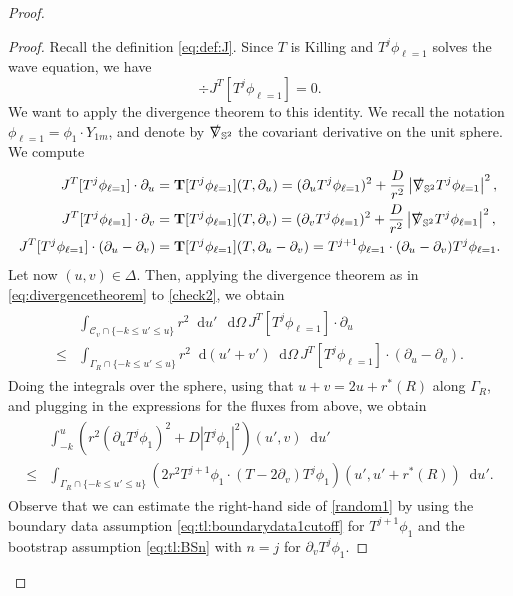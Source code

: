 \documentclass[11pt,english]{article}
\numberwithin{equation}{section}
\theoremstyle{remark}
\theoremstyle{plain}
\theoremstyle{remark}
\newcommand{\dd}{\mathop{}\!\mathrm{d}}
\newcommand{\pu}{\partial_u}
\newcommand{\pv}{\partial_v}
\renewcommand{\(}{\left(}
\renewcommand{\)}{\right)}
\begin{document}
\begin{proof}
\begin{proof}
Recall the definition \eqref{eq:def:J}. Since $T$ is Killing and $T^j\phi_{\ell=1}$ solves the wave equation, we have
\begin{equation}\label{check2}
\div J^T[T^j\phi_{\ell=1}]=0.
\end{equation}
We want to apply the divergence theorem to this identity. We recall the notation $\phi_{\ell=1}=\phi_1\cdot Y_{1m}$, and denote by $\slashed{\nabla}_{\mathbb{S}^2}$ the covariant derivative on the unit sphere. We compute
\begin{align*}
J^T[T^j\phi_{\ell=1}]\cdot \pu&=\mathbf{T}[T^j\phi_{\ell=1}](T,\pu)			=	(\pu T^j\phi_{\ell=1})^2+\frac{D}{r^2}\left|\slashed{\nabla}_{\mathbb{S}^2} T^j\phi_{\ell=1}\right|^2,		\\
J^T[T^j\phi_{\ell=1}]\cdot \pv&=\mathbf{T}[T^j\phi_{\ell=1}](T,\pv)			=		(\pv T^j\phi_{\ell=1})^2+\frac{D}{r^2}\left|\slashed{\nabla}_{\mathbb{S}^2} T^j \phi_{\ell=1}\right|^2	,	\\
J^T[T^j\phi_{\ell=1}]\cdot (\pu-\pv)&=\mathbf{T}[T^j\phi_{\ell=1}](T,\pu-\pv)	=	T^{j+1}\phi_{\ell=1}\cdot (\pu-\pv)T^j \phi_{\ell=1}	.
\end{align*}
Let now $(u,v)\in\Delta$. Then, applying the divergence theorem as in \eqref{eq:divergencetheorem} to \eqref{check2}, we obtain
\begin{align}
\begin{split}
&\int_{\mathcal{C}_{v}\cap\{-k\leq u'\leq u\}} r^2\dd u'\,  \dd\Omega\, J^T[T^j\phi_{\ell=1}]\cdot \pu \\
\leq &\int_{\Gamma_R\cap\{-k\leq u'\leq u\}}  r^2 \dd (u'+v')\dd \Omega	\,J^T[T^j\phi_{\ell=1}]\cdot(\pu-\pv).
\end{split}
\end{align}
Doing the integrals over the sphere, using that $u+v=2u+r^*(R)$ along $\Gamma_R$, and plugging in the expressions for the fluxes from above, we obtain
\begin{align}\label{random1}
\begin{split}
&\int_{-k}^u\left( r^2(\pu T^j\phi_{1})^2+D|T^j\phi_{1}|^2\right)(u',v)\dd u'	 \\
\leq&\int_{\Gamma_R\cap\{-k\leq u'\leq u\}}  \left(2r^2 T^{j+1}\phi_{1}\cdot (T-2\pv)T^j \phi_{1}\right)\left(u',u'+r^*(R)\right)	 \dd u'.
\end{split}
\end{align}
Observe that we can estimate the right-hand side of \eqref{random1} by using the boundary data assumption \eqref{eq:tl:boundarydata1cutoff} for $T^{j+1}\phi_1$ and the bootstrap assumption \eqref{eq:tl:BSn} with $n=j$ for $\pv T^j\phi_1$. 


\end{proof}
\end{proof}
\end{document}
